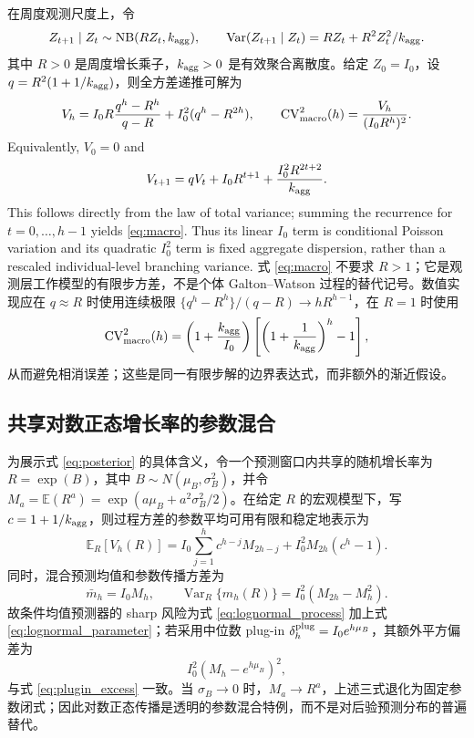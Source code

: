 \documentclass[11pt,a4paper]{article}
\begin{document}
在周度观测尺度上，令
\begin{equation}
Z_{t+1}\mid Z_t\sim \operatorname{NB}(R Z_t,k_{\rm agg}),\qquad
\operatorname{Var}(Z_{t+1}\mid Z_t)=RZ_t+R^2Z_t^2/k_{\rm agg}.
\end{equation}
其中 $R>0$ 是周度增长乘子，$k_{\rm agg}>0$ 是有效聚合离散度。给定 $Z_0=I_0$，设 $q=R^2(1+1/k_{\rm agg})$，则全方差递推可解为
\begin{equation}
V_h=I_0R\frac{q^h-R^h}{q-R}+I_0^2(q^h-R^{2h}),\qquad
\operatorname{CV}^2_{\rm macro}(h)=\frac{V_h}{(I_0R^h)^2}.\label{eq:macro}
\end{equation}
Equivalently, $V_0=0$ and
\begin{equation}
V_{t+1}=qV_t+I_0R^{t+1}+\frac{I_0^2R^{2t+2}}{k_{\rm agg}}.\label{eq:macro_recurrence}
\end{equation}
This follows directly from the law of total variance; summing the recurrence for $t=0,\ldots,h-1$ yields \eqref{eq:macro}. Thus its linear $I_0$ term is conditional Poisson variation and its quadratic $I_0^2$ term is fixed aggregate dispersion, rather than a rescaled individual-level branching variance.
式 \eqref{eq:macro} 不要求 $R>1$；它是观测层工作模型的有限步方差，不是个体 Galton--Watson 过程的替代记号。数值实现应在 $q\approx R$ 时使用连续极限 $\{q^h-R^h\}/(q-R)\to hR^{h-1}$，在 $R=1$ 时使用
\begin{equation}
\operatorname{CV}^2_{\rm macro}(h)=\left(1+\frac{k_{\rm agg}}{I_0}\right)\left[\left(1+\frac{1}{k_{\rm agg}}\right)^h-1\right],
\end{equation}
从而避免相消误差；这些是同一有限步解的边界表达式，而非额外的渐近假设。

\subsection{共享对数正态增长率的参数混合}

为展示式 \eqref{eq:posterior} 的具体含义，令一个预测窗口内共享的随机增长率为 $R=\exp(B)$，其中 $B\sim N(\mu_B,\sigma_B^2)$，并令 $M_a=\mathbb E(R^a)=\exp(a\mu_B+a^2\sigma_B^2/2)$。在给定 $R$ 的宏观模型下，写 $c=1+1/k_{\rm agg}$，则过程方差的参数平均可用有限和稳定地表示为
\begin{equation}
\mathbb E_R[V_h(R)]
=I_0\sum_{j=1}^{h}c^{h-j}M_{2h-j}
+I_0^2 M_{2h}(c^h-1).\label{eq:lognormal_process}
\end{equation}
同时，混合预测均值和参数传播方差为
\begin{equation}
\bar m_h=I_0M_h,\qquad
\operatorname{Var}_R\{m_h(R)\}=I_0^2(M_{2h}-M_h^2).\label{eq:lognormal_parameter}
\end{equation}
故条件均值预测器的 sharp 风险为式 \eqref{eq:lognormal_process} 加上式 \eqref{eq:lognormal_parameter}；若采用中位数 plug-in $\delta_h^{\rm plug}=I_0e^{h\mu_B}$，其额外平方偏差为
\begin{equation}
I_0^2\left(M_h-e^{h\mu_B}\right)^2,
\end{equation}
与式 \eqref{eq:plugin_excess} 一致。当 $\sigma_B\to0$ 时，$M_a\to R^a$，上述三式退化为固定参数闭式；因此对数正态传播是透明的参数混合特例，而不是对后验预测分布的普遍替代。
\end{document}
